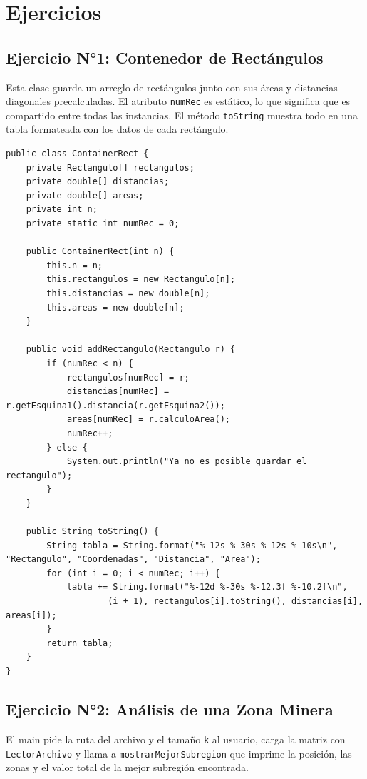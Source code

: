 \documentclass[12pt]{article}
\begin{document}
\newpage
\section{Ejercicios}
\subsection{Ejercicio N°1: Contenedor de Rectángulos}

Esta clase guarda un arreglo de rectángulos junto con sus áreas y distancias 
diagonales precalculadas. El atributo \texttt{numRec} es estático, lo que 
significa que es compartido entre todas las instancias. El método \texttt{toString} 
muestra todo en una tabla formateada con los datos de cada rectángulo.
\begin{verbatim}
public class ContainerRect {
    private Rectangulo[] rectangulos;
    private double[] distancias;
    private double[] areas;
    private int n;
    private static int numRec = 0;

    public ContainerRect(int n) {
        this.n = n;
        this.rectangulos = new Rectangulo[n];
        this.distancias = new double[n];
        this.areas = new double[n];
    }

    public void addRectangulo(Rectangulo r) {
        if (numRec < n) {
            rectangulos[numRec] = r;
            distancias[numRec] = r.getEsquina1().distancia(r.getEsquina2());
            areas[numRec] = r.calculoArea();
            numRec++;
        } else {
            System.out.println("Ya no es posible guardar el rectangulo");
        }
    }

    public String toString() {
        String tabla = String.format("%-12s %-30s %-12s %-10s\n", "Rectangulo", "Coordenadas", "Distancia", "Area");
        for (int i = 0; i < numRec; i++) {
            tabla += String.format("%-12d %-30s %-12.3f %-10.2f\n", 
                    (i + 1), rectangulos[i].toString(), distancias[i], areas[i]);
        }
        return tabla;
    }
}

\end{verbatim}

\subsection{Ejercicio N°2: Análisis de una Zona Minera}

El main pide la ruta del archivo y el tamaño \texttt{k} al usuario, carga 
la matriz con \texttt{LectorArchivo} y llama a \texttt{mostrarMejorSubregion} 
que imprime la posición, las zonas y el valor total de la mejor subregión encontrada.
\end{document}
